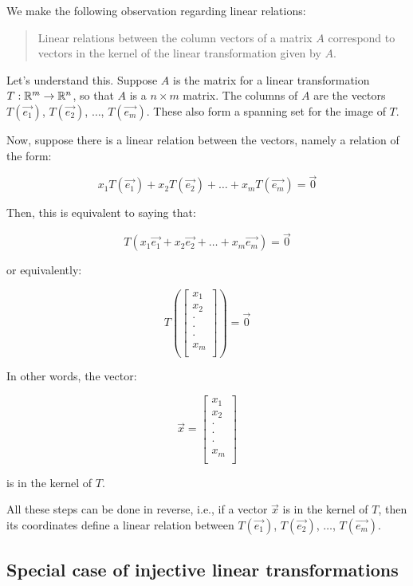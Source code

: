 \documentclass[10pt]{amsart}
\begin{document}
We make the following observation regarding linear relations:

\begin{quote}
  Linear relations between the column vectors of a matrix $A$
  correspond to vectors in the kernel of the linear transformation
  given by $A$.
\end{quote}

Let's understand this. Suppose $A$ is the matrix for a linear
transformation $T:\mathbb{R}^m \to \mathbb{R}^n$, so that $A$ is a $n \times m$
matrix. The columns of $A$ are the vectors $T(\vec{e_1})$,
$T(\vec{e_2})$, $\dots$, $T(\vec{e_m})$. These also form a spanning
  set for the image of $T$.

Now, suppose there is a linear relation between the vectors, namely a
relation of the form:

$$x_1T(\vec{e_1}) + x_2T(\vec{e_2}) + \dots + x_mT(\vec{e_m}) = \vec{0}$$

Then, this is equivalent to saying that:

$$T(x_1\vec{e_1} + x_2\vec{e_2} + \dots + x_m\vec{e_m}) = \vec{0}$$

or equivalently:

$$T\left(\left[ \begin{matrix} x_1 \\ x_2 \\ \cdot \\ \cdot \\ \cdot \\ x_m \\\end{matrix}\right]\right) = \vec{0}$$

In other words, the vector:

$$\vec{x} = \left[ \begin{matrix} x_1 \\ x_2 \\ \cdot \\ \cdot \\ \cdot \\ x_m  \\\end{matrix}\right]$$

is in the kernel of $T$.

All these steps can be done in reverse, i.e., if a vector $\vec{x}$ is
in the kernel of $T$, then its coordinates define a linear relation
between $T(\vec{e_1})$, $T(\vec{e_2})$, $\dots$, $T(\vec{e_m})$.

\subsection{Special case of injective linear transformations}
\end{document}
